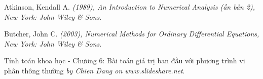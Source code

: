 \documentclass[a4paper]{article}
\begin{document}
\begin{thebibliography}{99999}
Atkinson, Kendall A.
\textit{(1989), An Introduction to Numerical Analysis (ấn bản 2), New
York: John Wiley \& Sons}. 

Butcher, John C.
\textit{(2003), Numerical Methods for Ordinary Differential Equations, New
York: John Wiley \& Sons}. 

Tính toán khoa học - Chương 6: Bài toán giá trị ban đầu với phương trình vi phân thông thường
\textit{by Chien Dang on www.slideshare.net}. 

\end{thebibliography}
\end{document}
